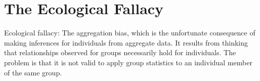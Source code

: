 
\section{The Ecological Fallacy}
Ecological fallacy: The aggregation bias, which is the unfortunate consequence of making inferences for individuals from aggregate data. It results from thinking that relationships observed for groups necessarily hold for individuals. The problem is that it is not valid to apply group statistics to an individual member of the same group.

